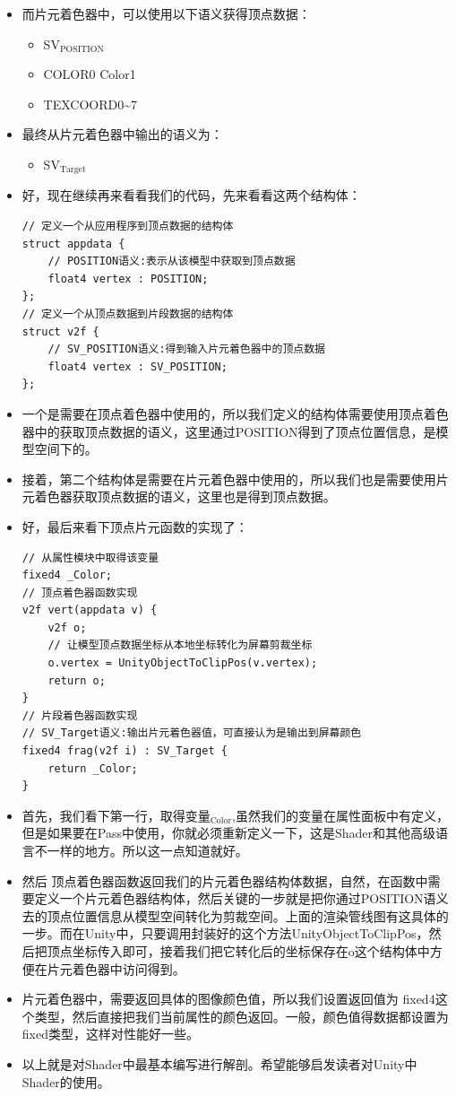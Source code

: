 \documentclass[9pt, b5paper]{article}
\begin{document}
\begin{itemize}
\begin{itemize}
\end{itemize}
\item 而片元着色器中，可以使用以下语义获得顶点数据：
\begin{itemize}
\item SV$_{\text{POSITION}}$
\item COLOR0 Color1
\item TEXCOORD0\textasciitilde{}7
\end{itemize}
\item 最终从片元着色器中输出的语义为：
\begin{itemize}
\item SV$_{\text{Target}}$
\end{itemize}
\item 好，现在继续再来看看我们的代码，先来看看这两个结构体：
\begin{verbatim}
// 定义一个从应用程序到顶点数据的结构体  
struct appdata {
    // POSITION语义:表示从该模型中获取到顶点数据      
    float4 vertex : POSITION;
};  
// 定义一个从顶点数据到片段数据的结构体  
struct v2f {
    // SV_POSITION语义:得到输入片元着色器中的顶点数据  
    float4 vertex : SV_POSITION;
};
\end{verbatim}
\item 一个是需要在顶点着色器中使用的，所以我们定义的结构体需要使用顶点着色器中的获取顶点数据的语义，这里通过POSITION得到了顶点位置信息，是模型空间下的。
\item 接着，第二个结构体是需要在片元着色器中使用的，所以我们也是需要使用片元着色器获取顶点数据的语义，这里也是得到顶点数据。
\item 好，最后来看下顶点片元函数的实现了：
\begin{verbatim}
// 从属性模块中取得该变量  
fixed4 _Color;  
// 顶点着色器函数实现  
v2f vert(appdata v) {  
    v2f o;
    // 让模型顶点数据坐标从本地坐标转化为屏幕剪裁坐标      
    o.vertex = UnityObjectToClipPos(v.vertex);
    return o;  
}  
// 片段着色器函数实现
// SV_Target语义:输出片元着色器值，可直接认为是输出到屏幕颜色 
fixed4 frag(v2f i) : SV_Target {
    return _Color;  
}
\end{verbatim}
\item 首先，我们看下第一行，取得变量$_{\text{Color}}$,虽然我们的变量在属性面板中有定义，但是如果要在Pass中使用，你就必须重新定义一下，这是Shader和其他高级语言不一样的地方。所以这一点知道就好。
\item 然后 顶点着色器函数返回我们的片元着色器结构体数据，自然，在函数中需要定义一个片元着色器结构体，然后关键的一步就是把你通过POSITION语义去的顶点位置信息从模型空间转化为剪裁空间。上面的渲染管线图有这具体的一步。而在Unity中，只要调用封装好的这个方法UnityObjectToClipPos，然后把顶点坐标传入即可，接着我们把它转化后的坐标保存在o这个结构体中方便在片元着色器中访问得到。
\item 片元着色器中，需要返回具体的图像颜色值，所以我们设置返回值为 fixed4这个类型，然后直接把我们当前属性的颜色返回。一般，颜色值得数据都设置为fixed类型，这样对性能好一些。
\item 以上就是对Shader中最基本编写进行解剖。希望能够启发读者对Unity中Shader的使用。
\end{itemize}
\end{document}

